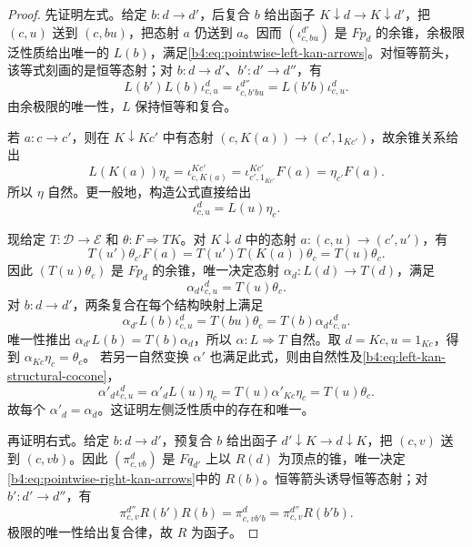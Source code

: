 \begin{proof}
	先证明左式。给定 \(b:d\rightarrow d'\)，后复合 \(b\) 给出函子 \(K\downarrow d\rightarrow K\downarrow d'\)，把 \((c,u)\) 送到 \((c,bu)\)，把态射 \(a\) 仍送到 \(a\)。因而 \((\iota^{d'}_{c,bu})\) 是 \(F p_d\) 的余锥，余极限泛性质给出唯一的 \(L(b)\)，满足\eqref{b4:eq:pointwise-left-kan-arrows}。对恒等箭头，该等式刻画的是恒等态射；对 \(b:d\rightarrow d'\)、\(b':d'\rightarrow d''\)，有
	\[
		L(b')L(b)\iota^d_{c,u}
		=\iota^{d''}_{c,b'bu}
		=L(b'b)\iota^d_{c,u}.
	\]
	由余极限的唯一性，\(L\) 保持恒等和复合。

	若 \(a:c\rightarrow c'\)，则在 \(K\downarrow Kc'\) 中有态射
	\((c,K(a))\rightarrow(c',1_{Kc'})\)，故余锥关系给出
	\[
		L(K(a))\eta_c
		=\iota^{Kc'}_{c,K(a)}
		=\iota^{Kc'}_{c',1_{Kc'}}F(a)
		=\eta_{c'}F(a).
	\]
	所以 \(\eta\) 自然。更一般地，构造公式直接给出
	\begin{equation}\label{b4:eq:left-kan-structural-cocone}
		\iota^d_{c,u}=L(u)\eta_c.
	\end{equation}

	现给定 \(T:\mathcal D\rightarrow\mathcal E\) 和 \(\theta:F\Rightarrow TK\)。对 \(K\downarrow d\) 中的态射 \(a:(c,u)\rightarrow(c',u')\)，有
	\[
		T(u')\theta_{c'}F(a)
		=T(u')T(K(a))\theta_c
		=T(u)\theta_c.
	\]
	因此 \((T(u)\theta_c)\) 是 \(F p_d\) 的余锥，唯一决定态射 \(\alpha_d:L(d)\rightarrow T(d)\)，满足
	\begin{equation}\label{b4:eq:left-kan-factorization}
		\alpha_d\iota^d_{c,u}=T(u)\theta_c.
	\end{equation}
	对 \(b:d\rightarrow d'\)，两条复合在每个结构映射上满足
	\[
		\alpha_{d'}L(b)\iota^d_{c,u}
		=T(bu)\theta_c
		=T(b)\alpha_d\iota^d_{c,u}.
	\]
	唯一性推出 \(\alpha_{d'}L(b)=T(b)\alpha_d\)，所以 \(\alpha:L\Rightarrow T\) 自然。取 \(d=Kc,u=1_{Kc}\)，得到 \(\alpha_{Kc}\eta_c=\theta_c\)。
	若另一自然变换 \(\alpha'\) 也满足此式，则由自然性及\eqref{b4:eq:left-kan-structural-cocone}，
	\[
		\alpha'_d\iota^d_{c,u}
		=\alpha'_dL(u)\eta_c
		=T(u)\alpha'_{Kc}\eta_c=T(u)\theta_c.
	\]
	故每个 \(\alpha'_d=\alpha_d\)。这证明左侧泛性质中的存在和唯一。

	再证明右式。给定 \(b:d\rightarrow d'\)，预复合 \(b\) 给出函子 \(d'\downarrow K\rightarrow d\downarrow K\)，把 \((c,v)\) 送到 \((c,vb)\)。因此 \((\pi^d_{c,vb})\) 是 \(Fq_{d'}\) 上以 \(R(d)\) 为顶点的锥，唯一决定\eqref{b4:eq:pointwise-right-kan-arrows}中的 \(R(b)\)。恒等箭头诱导恒等态射；对 \(b':d'\rightarrow d''\)，有
	\[
		\pi^{d''}_{c,v}R(b')R(b)
		=\pi^d_{c,vb'b}
		=\pi^{d''}_{c,v}R(b'b).
	\]
	极限的唯一性给出复合律，故 \(R\) 为函子。


\end{proof}
